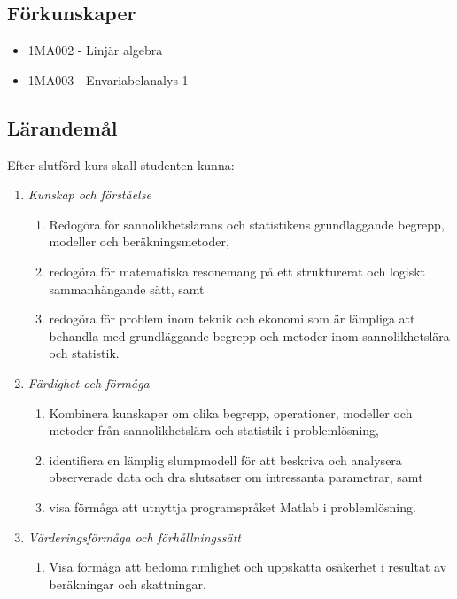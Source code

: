 \subsection*{Förkunskaper}

\begin{itemize}
\tightlist
\item
  1MA002 - Linjär algebra
\item
  1MA003 - Envariabelanalys 1
\end{itemize}

\subsection*{Lärandemål}

Efter slutförd kurs skall studenten kunna:

\begin{enumerate}
\def\labelenumi{\Alph{enumi}.}
\tightlist
\item
  \emph{Kunskap och förståelse}

  \begin{enumerate}
  \def\labelenumii{\Alph{enumi}.\arabic{enumii}.}
  \tightlist
  \item
    Redogöra för sannolikhetslärans och statistikens grundläggande
    begrepp, modeller och beräkningsmetoder,
  \item
    redogöra för matematiska resonemang på ett strukturerat och logiskt
    sammanhängande sätt, samt
  \item
    redogöra för problem inom teknik och ekonomi som är lämpliga att
    behandla med grundläggande begrepp och metoder inom sannolikhetslära
    och statistik.
  \end{enumerate}
\item
  \emph{Färdighet och förmåga}

  \begin{enumerate}
  \def\labelenumii{\Alph{enumi}.\arabic{enumii}.}
  \tightlist
  \item
    Kombinera kunskaper om olika begrepp, operationer, modeller och
    metoder från sannolikhetslära och statistik i problemlösning,
  \item
    identifiera en lämplig slumpmodell för att beskriva och analysera
    observerade data och dra slutsatser om intressanta parametrar, samt
  \item
    visa förmåga att utnyttja programspråket Matlab i problemlösning.
  \end{enumerate}
\item
  \emph{Värderingsförmåga och förhållningssätt}

  \begin{enumerate}
  \def\labelenumii{\Alph{enumi}.\arabic{enumii}.}
  \tightlist
  \item
    Visa förmåga att bedöma rimlighet och uppskatta osäkerhet i resultat
    av beräkningar och skattningar.
  \end{enumerate}
\end{enumerate}

